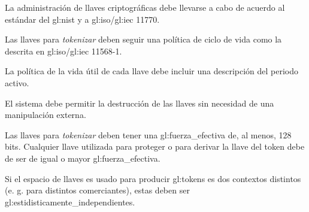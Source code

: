 



{
  La administración de llaves criptográficas debe llevarse a cabo de
  acuerdo al estándar del \gls{gl:nist} \cite{nist_llaves} y a
  \acrshort{gl:iso}/\acrshort{gl:iec} 11770.

  {
    Las llaves para \textit{tokenizar} deben seguir una política de
    ciclo de vida como la descrita en  \acrshort{gl:iso}/\acrshort{gl:iec}
    11568-1.
  }

  {
    La política de la vida útil de cada llave debe incluir una
    descripción del periodo activo.
  }

  {
    El sistema debe permitir la destrucción de las llaves sin necesidad
    de una manipulación externa.
  }
}

{
  Las llaves para \textit{tokenizar} deben tener una
  \gls{gl:fuerza_efectiva} de, al menos, 128 bits. Cualquier llave utilizada
  para proteger o para derivar la llave del token debe de ser de igual o
  mayor \gls{gl:fuerza_efectiva}.
}

{
  Si el espacio de llaves es usado para producir \glspl{gl:token} es dos
  contextos distintos (e. g. para distintos comerciantes), estas deben ser
  \glspl{gl:estidisticamente_independiente}.
}
